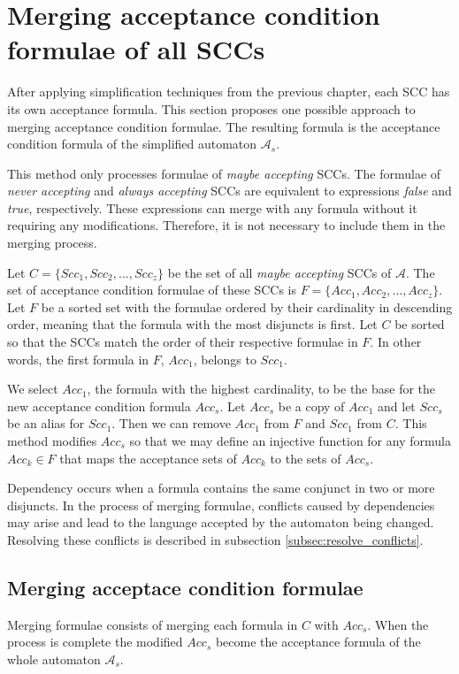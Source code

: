 \documentclass[
  digital, %
  twoside, %
  table,   %
  lof,     %
  lot,     %
]{fithesis3}
\begin{document}
\section{Merging acceptance condition formulae of all SCCs}
After applying simplification techniques from the previous chapter, each SCC has its own acceptance formula. This section proposes one possible approach to merging acceptance condition formulae. The resulting formula is the acceptance condition formula of the simplified automaton $\mathcal{A}_s$.

This method only processes formulae of \emph{maybe accepting} SCCs. The formulae of \emph{never accepting} and \emph{always accepting} SCCs are equivalent to expressions \emph{false} and \emph{true}, respectively. These expressions can merge with any formula without it requiring any modifications. Therefore, it is not necessary to include them in the merging process. 

Let $C = \{Scc_1, Scc_2, \dots, Scc_z\}$ be the set of all \emph{maybe accepting} SCCs of $\mathcal{A}$. The set of acceptance condition formulae of these SCCs is $F = \{Acc_1, Acc_2, \dots, Acc_z\}$. Let $F$ be a sorted set with the formulae ordered by their cardinality in descending order, meaning that the formula with the most disjuncts is first. Let $C$ be sorted so that the SCCs match the order of their respective formulae in $F$. In other words, the first formula in $F$, $Acc_1$, belongs to $Scc_1$.

We select $Acc_1$, the formula with the highest cardinality, to be the base for the new acceptance condition formula $Acc_s$. Let $Acc_s$ be a copy of $Acc_1$ and let $Scc_s$ be an alias for $Scc_1$. Then we can remove $Acc_1$ from $F$ and $Scc_1$ from $C$. This method modifies $Acc_s$ so that we may define an injective function for any formula $Acc_k \in F$ that maps the acceptance sets of $Acc_k$ to the sets of $Acc_s$. 

Dependency occurs when a formula contains the same conjunct in two or more disjuncts. In the process of merging formulae, conflicts caused by dependencies may arise and lead to the language accepted by the automaton being changed. Resolving these conflicts is described in subsection \ref{subsec:resolve_conflicts}. 

\subsection{Merging acceptace condition formulae}
Merging formulae consists of merging each formula in $C$ with $Acc_s$. When the process is complete the modified $Acc_s$ become the acceptance formula of the whole automaton $\mathcal{A}_s$.
\end{document}
